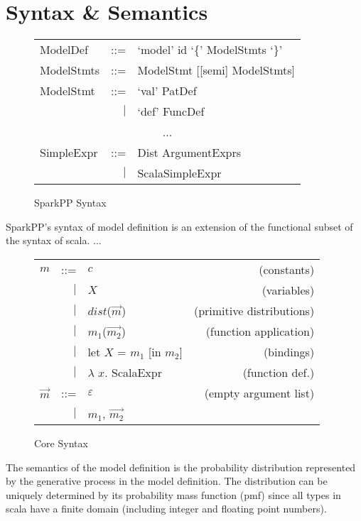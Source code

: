 \section{Syntax \& Semantics}
\label{sec:syntax_semantics}

\begin{figure}[!h]
\small
	\begin{tabular}{lrl}
		ModelDef & ::= & `model' id `\{' ModelStmts `\}' \\
		ModelStmts & ::= & ModelStmt [[semi] ModelStmts] \\
		ModelStmt & ::= & `val' PatDef \\
				  & $|$ & `def' FuncDef \\
		\multicolumn{3}{c}{...} \\
		SimpleExpr & ::= & Dist ArgumentExprs \\
				   & $|$ & ScalaSimpleExpr
	\end{tabular}
\caption{SparkPP Syntax}
\label{fig:sparkpp_syntax}
\end{figure}

SparkPP's syntax of model definition is an extension of the functional subset
of the syntax of scala. ... 

\begin{figure}[!h]
\small
\begin{tabular}{lrlr}
	$m$ & ::= & $c$ & (constants) \\
	  & $|$ & $X$ & (variables) \\
	  & $|$ & $dist$($\vec{m}$) & (primitive distributions) \\
	  & $|$ & $m_1$($\vec{m_2}$) & (function application) \\
	  & $|$ & let $X$ = $m_1$ [in $m_2$] & (bindings) \\
	  & $|$ & $\lambda$ $x$. ScalaExpr & (function def.) \\
	$\vec{m}$ & ::= & $\varepsilon$ & (empty argument list) \\
			& $|$ & $m_1$, $\vec{m_2}$ & \\

\end{tabular}
\caption{Core Syntax}
\label{fig:core_syntax}
\end{figure}

The semantics of the model definition is the probability distribution
represented by the generative process in the model definition. The
distribution can be uniquely determined by its probability mass function (pmf)
since all types in scala have a finite domain (including integer and floating
point numbers).


